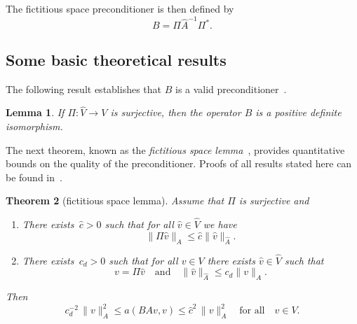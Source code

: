 \documentclass[11pt]{article}
\newtheorem{lemma}{Lemma}[section]
\newtheorem{theorem}[lemma]{Theorem}
\theoremstyle{remark}
\begin{document}
The fictitious space preconditioner is then defined by
\begin{equation}
  \label{eq:fsp}
  B = \Pi\widehat{A}^{-1}\Pi^*.
\end{equation}
\subsection{Some basic theoretical results}
The following result establishes that $B$ is a valid preconditioner~\cite{HiptmairXu2007}.
\begin{lemma}
  If\/ $\Pi : \widehat{V} \to V$ is surjective, then the operator $B$ is
  a positive definite isomorphism.
\end{lemma}

The next theorem, known as the \emph{fictitious space lemma}~\cite{Nepomnyaschikh1992}, provides quantitative bounds on the quality of the preconditioner. Proofs of all results stated here can be found in~\cite{HiptmairXu2007,Xu1996,Nepomnyaschikh1992}.
\begin{theorem}[fictitious space lemma]
  \label{thm:fsl}
  Assume that $\Pi$ is surjective and
  \begin{enumerate}[{\bf i.}]
    \item There exists\, $\widehat{c} > 0$ such that for all $\widehat{v} \in \widehat{V}$ we have
    \begin{equation}\label{eq:fsl-bdd}
     \|\Pi\widehat{v}\|_A \le \widehat{c}\|\widehat{v}\|_{\widehat{A}}.
  \end{equation}
   \item There exists\, $c_d > 0$ such that for all $v \in V$ there exists
    $\widehat{v} \in \widehat{V}$ such that
    \begin{equation}\label{eq:fsl-stab}
    v = \Pi\widehat{v} \quad\mbox{and}\quad
    \|\widehat{v}\|_{\widehat{A}} \le c_d\|v\|_A.
    \end{equation}
\end{enumerate}
  Then
  \begin{equation}
    \label{eq:fsl-result}
    c_d^{-2}\,\|v\|_A^2 \le a(BA v, v)
    \le \widehat{c}^2\,\|v\|_A^2 \quad \mbox{for all}\quad  v \in V.
  \end{equation}
\end{theorem}
\end{document}

